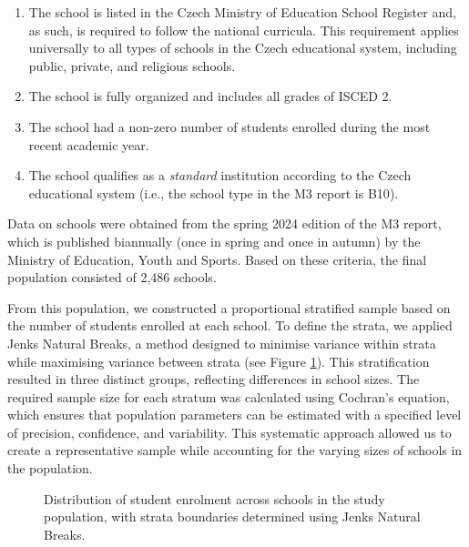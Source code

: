 \documentclass[]{interact}
\theoremstyle{plain}%
\theoremstyle{definition}
\theoremstyle{remark}
\begin{document}
\begin{enumerate}
    \item The school is listed in the Czech Ministry of Education School Register and, as such, is required to follow the national curricula. This requirement applies universally to all types of schools in the Czech educational system, including public, private, and religious schools.
    \item The school is fully organized and includes all grades of ISCED 2.
    \item The school had a non-zero number of students enrolled during the most recent academic year.
    \item The school qualifies as a \textit{standard} institution according to the Czech educational system (i.e., the school type in the M3 report is \textsc{B10}).
\end{enumerate}


Data on schools were obtained from the spring 2024 edition of the M3 report, which is published biannually (once in spring and once in autumn) by the Ministry of Education, Youth and Sports. Based on these criteria, the final population consisted of 2,486 schools.

From this population, we constructed a proportional stratified sample based on the number of students enrolled at each school. To define the strata, we applied Jenks Natural Breaks, a method designed to minimise variance within strata while maximising variance between strata (see Figure \ref{school-distribution-plot}). This stratification resulted in three distinct groups, reflecting differences in school sizes. The required sample size for each stratum was calculated using Cochran’s equation, which ensures that population parameters can be estimated with a specified level of precision, confidence, and variability. This systematic approach allowed us to create a representative sample while accounting for the varying sizes of schools in the population.


\begin{figure} \centering {} \caption{Distribution of student enrolment across schools in the study population, with strata boundaries determined using Jenks Natural Breaks.} \label{school-distribution-plot} \end{figure}
\end{document}
